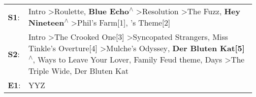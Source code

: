\begin{supertabular}{p{0.03\textwidth}p{0.92\textwidth}}
 \textbf{S1}:  &                                                                                                                                                                              Intro\textsuperscript{} \textgreater \enspace Roulette\textsuperscript{}, \enspace \textbf{Blue Echo\textsuperscript{$\wedge$}} \textgreater \enspace Resolution\textsuperscript{} \textgreater \enspace The Fuzz\textsuperscript{}, \enspace \textbf{Hey Nineteen\textsuperscript{$\wedge$}} \textgreater \enspace Phil's Farm[1]\textsuperscript{}, 's Theme[2]\textsuperscript{}  \enspace  \\
 \textbf{S2}:  &  Intro\textsuperscript{} \textgreater \enspace The Crooked One[3]\textsuperscript{} \textgreater \enspace Syncopated Strangers\textsuperscript{}, \enspace Miss Tinkle's Overture[4]\textsuperscript{} \textgreater \enspace Mulche's Odyssey\textsuperscript{}, \enspace \textbf{Der Bluten Kat[5]\textsuperscript{$\wedge$}},  Ways to Leave Your Lover\textsuperscript{}, \enspace Family Feud theme\textsuperscript{},  Days\textsuperscript{} \textgreater \enspace The Triple Wide\textsuperscript{}, \enspace Der Bluten Kat\textsuperscript{}  \enspace  \\
 \textbf{E1}:  &                                                                                                                                                                                                                                                                                                                                                                                                                                                                                                                                                       YYZ\textsuperscript{}  \enspace  \\
\end{supertabular}
